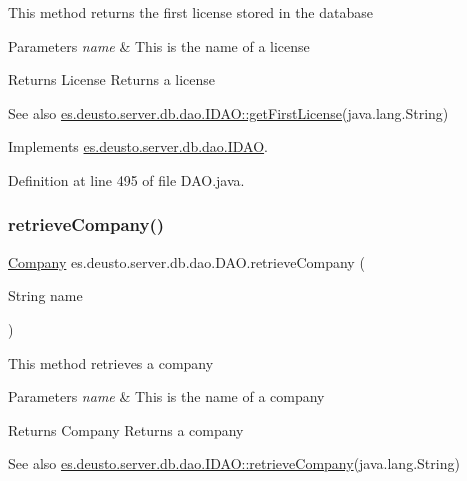 This method returns the first license stored in the database 
\begin{DoxyParams}{Parameters}
{\em name} & This is the name of a license \\
\hline
\end{DoxyParams}
\begin{DoxyReturn}{Returns}
License Returns a license 
\end{DoxyReturn}
\begin{DoxySeeAlso}{See also}
\hyperlink{interfacees_1_1deusto_1_1server_1_1db_1_1dao_1_1_i_d_a_o_aef2783889a572e23bd57c5a2a955599a}{es.\+deusto.\+server.\+db.\+dao.\+I\+D\+A\+O\+::get\+First\+License}(java.\+lang.\+String) 
\end{DoxySeeAlso}


Implements \hyperlink{interfacees_1_1deusto_1_1server_1_1db_1_1dao_1_1_i_d_a_o_aef2783889a572e23bd57c5a2a955599a}{es.\+deusto.\+server.\+db.\+dao.\+I\+D\+AO}.



Definition at line 495 of file D\+A\+O.\+java.

\mbox{\label{classes_1_1deusto_1_1server_1_1db_1_1dao_1_1_d_a_o_aabd374b169473cfd6e1bdc4efc89b177}} 
\subsubsection{\texorpdfstring{retrieve\+Company()}{retrieveCompany()}}
{\footnotesize\ttfamily \hyperlink{classes_1_1deusto_1_1server_1_1db_1_1data_1_1_company}{Company} es.\+deusto.\+server.\+db.\+dao.\+D\+A\+O.\+retrieve\+Company (\begin{DoxyParamCaption}\item[{String}]{name }\end{DoxyParamCaption})}

This method retrieves a company 
\begin{DoxyParams}{Parameters}
{\em name} & This is the name of a company \\
\hline
\end{DoxyParams}
\begin{DoxyReturn}{Returns}
Company Returns a company 
\end{DoxyReturn}
\begin{DoxySeeAlso}{See also}
\hyperlink{interfacees_1_1deusto_1_1server_1_1db_1_1dao_1_1_i_d_a_o_ad6fd7873e2191e887184e2261e34e3e5}{es.\+deusto.\+server.\+db.\+dao.\+I\+D\+A\+O\+::retrieve\+Company}(java.\+lang.\+String) 
\end{DoxySeeAlso}


